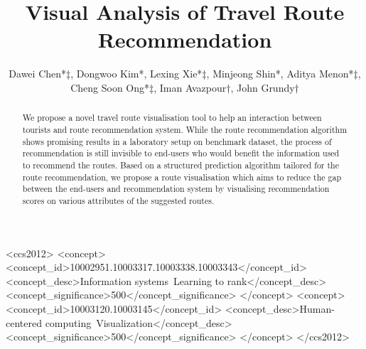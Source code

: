 \documentclass[sigconf]{acmart}
\begin{document}
\title{Visual Analysis of Travel Route Recommendation}

\author{Dawei Chen*$\ddagger$, Dongwoo Kim*, Lexing Xie*$\ddagger$,  Minjeong Shin*, Aditya Menon*$\ddagger$, Cheng Soon Ong*$\ddagger$, Iman Avazpour$\dagger$, John Grundy$\dagger$}


%

\renewcommand{\shortauthors}{D. Chen et al.}


\begin{abstract}
We propose a novel travel route visualisation tool to help an interaction between tourists and route recommendation system. 
While the route recommendation algorithm shows promising results in a laboratory setup on benchmark dataset, the process of recommendation is still invisible to end-users who would benefit the information used to recommend the routes. 
Based on a structured prediction algorithm tailored for the route recommendation, we propose a route visualisation which aims to reduce the gap between the end-users and recommendation system by visualising recommendation scores on various attributes of the suggested routes.
\end{abstract}

%
%
\begin{CCSXML}
<ccs2012>
<concept>
<concept_id>10002951.10003317.10003338.10003343</concept_id>
<concept_desc>Information systems~Learning to rank</concept_desc>
<concept_significance>500</concept_significance>
</concept>
<concept>
<concept_id>10003120.10003145</concept_id>
<concept_desc>Human-centered computing~Visualization</concept_desc>
<concept_significance>500</concept_significance>
</concept>
</ccs2012>
\end{CCSXML}
\end{document}

